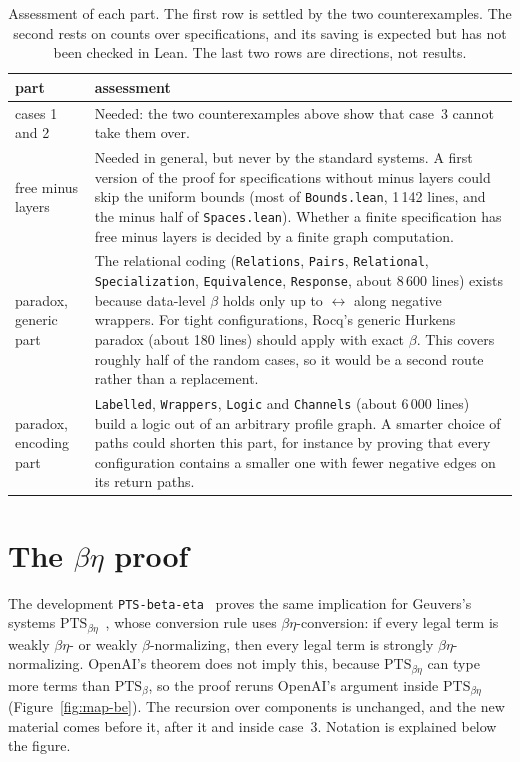 \documentclass[10pt]{article}
\begin{document}
\begin{table}[H]
\centering\small
\begin{tabular}{>{\raggedright\arraybackslash}p{3.2cm}>{\raggedright\arraybackslash}p{11.8cm}}
\toprule
part & assessment\\
\midrule
cases 1 and 2 & Needed: the two counterexamples above show that case~3 cannot take
  them over.\\ \addlinespace
free minus layers & Needed in general, but never by the standard systems. A first
  version of the proof for specifications without minus layers could skip the
  uniform bounds (most of \texttt{Bounds.lean}, 1\,142 lines, and the minus half of
  \texttt{Spaces.lean}). Whether a finite specification has free minus layers is
  decided by a finite graph computation.\\ \addlinespace
paradox, generic part & The relational coding (\texttt{Relations}, \texttt{Pairs},
  \texttt{Relational}, \texttt{Specialization}, \texttt{Equivalence},
  \texttt{Response}, about 8\,600 lines) exists because data-level $\beta$ holds
  only up to $\leftrightarrow$ along negative wrappers. For tight configurations,
  Rocq's generic Hurkens paradox (about 180 lines) should apply with exact $\beta$.
  This covers roughly half of the random cases, so it would be a second route rather
  than a replacement.\\ \addlinespace
paradox, encoding part & \texttt{Labelled}, \texttt{Wrappers}, \texttt{Logic} and
  \texttt{Channels} (about 6\,000 lines) build a logic out of an arbitrary profile
  graph. A smarter choice of paths could shorten this part, for instance by proving
  that every configuration contains a smaller one with fewer negative edges on its
  return paths.\\
\bottomrule
\end{tabular}
\caption{Assessment of each part. The first row is settled by the two
counterexamples. The second rests on counts over specifications, and its saving is
expected but has not been checked in Lean. The last two rows are directions, not
results.}
\label{tab:assessment}
\end{table}

\clearpage
\section{The \texorpdfstring{$\beta\eta$}{beta-eta} proof}\label{sec:be}

The development \texttt{PTS-beta-eta}~\cite{PTSbetaetaLean} proves the same
implication for Geuvers's systems $\mathrm{PTS}_{\beta\eta}$~\cite{Geuvers1993},
whose conversion rule uses $\beta\eta$-conversion: if every legal term is weakly
$\beta\eta$- or weakly $\beta$-normalizing, then every legal term is strongly
$\beta\eta$-normalizing. OpenAI's theorem does not imply this, because
$\mathrm{PTS}_{\beta\eta}$ can type more terms than $\mathrm{PTS}_\beta$, so the
proof reruns OpenAI's argument inside $\mathrm{PTS}_{\beta\eta}$
(Figure~\ref{fig:map-be}). The recursion over components is unchanged, and the new
material comes before it, after it and inside case~3. Notation is explained below
the figure.
\end{document}
